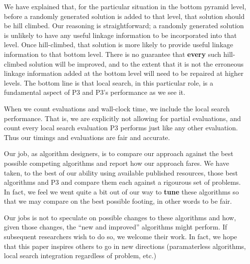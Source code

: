 \documentclass[]{article}
\begin{document}
We have explained that, for the particular situation in the bottom pyramid level, before a randomly generated solution is added to that level, that solution should be hill climbed. Our reasoning is straightforward; a randomly generated solution is unlikely to have any useful linkage information to be incorporated into that level. Once hill-climbed, that solution is more likely to provide useful linkage information to that bottom level. There is no guarantee that \textbf{every} such hill-climbed solution will be improved, and to the extent that it is not the erroneous linkage information added at the bottom level will need to be repaired at higher levels.  The bottom line is that local search, in this particular role, is a fundamental aspect of P3 and P3's performance as we see it. 

When we count evaluations and wall-clock time, we include the local search performance. That is, we are explicitly not allowing for partial evaluations, and count every local search evaluation P3 performs just like any other evaluation. Thus our timings and evaluations are fair and accurate.

Our job, as algorithm designers, is to compare our approach against the best possible competing algorithms and report how our approach fares. We have taken, to the best of our ability using available published resources, those best algorithms and  P3 and compare them each against a rigourous set of problems. In fact, we feel we went quite a bit out of our way to \textbf{tune} these algorithms so that we may compare on the best possible footing, in other words to be fair.

Our jobs is not to speculate on possible changes to these algorithms and how, given those changes, the ``new and improved'' algorithms might perform. If subsequent researchers wish to do so, we welcome their work. In fact, we hope that this paper inspires others to go in new directions (paramaterless algorithms, local search integration regardless of problem, etc.)
\end{document}
